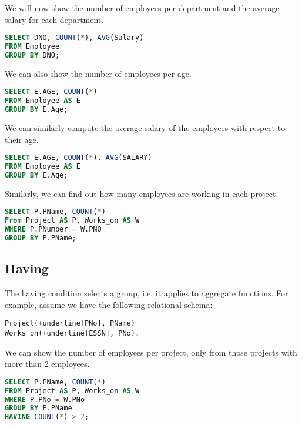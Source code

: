 \documentclass[a4paper, openany]{memoir}
\begin{document}
We will now show the number of employees per department and the average salary for each department.
\begin{lstlisting}[language=SQL]
SELECT DNO, COUNT(*), AVG(Salary)
FROM Employee
GROUP BY DNO;
\end{lstlisting}
We can also show the number of employees per age.
\begin{lstlisting}[language=SQL]
SELECT E.AGE, COUNT(*)
FROM Employee AS E
GROUP BY E.Age;
\end{lstlisting}
We can similarly compute the average salary of the employees with respect to their age.
\begin{lstlisting}[language=SQL]
SELECT E.AGE, COUNT(*), AVG(SALARY)
FROM Employee AS E
GROUP BY E.Age;
\end{lstlisting}
Similarly, we can find out how many employees are working in each project.
\begin{lstlisting}[language=SQL]
SELECT P.PName, COUNT(*)
From Project AS P, Works_on AS W
WHERE P.PNumber = W.PNO
GROUP BY P.PName;
\end{lstlisting}


\subsection{Having}
The having condition selects a group, i.e. it applies to aggregate functions. For example, assume we have the following relational schema:
\begin{Verbatim}[commandchars=+\[\]]
Project(+underline[PNo], PName)
Works_on(+underline[ESSN], PNo).
\end{Verbatim}
We can show the number of employees per project, only from those projects with more than 2 employees.
\begin{lstlisting}[language=SQL]
SELECT P.PName, COUNT(*)
FROM Project AS P, Works_on AS W
WHERE P.PNo = W.PNo
GROUP BY P.PName
HAVING COUNT(*) > 2;
\end{lstlisting}
\end{document}

